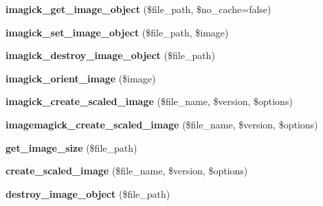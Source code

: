 \begin{DoxyCompactItemize}
\item 
\hypertarget{class_upload_handler_a3798f58b7fc8504ec4f89769b6785a75}{{\bfseries imagick\-\_\-get\-\_\-image\-\_\-object} (\$file\-\_\-path, \$no\-\_\-cache=false)}\label{class_upload_handler_a3798f58b7fc8504ec4f89769b6785a75}

\item 
\hypertarget{class_upload_handler_aa899be32e9c6b6d4b9795a05c08fb37c}{{\bfseries imagick\-\_\-set\-\_\-image\-\_\-object} (\$file\-\_\-path, \$image)}\label{class_upload_handler_aa899be32e9c6b6d4b9795a05c08fb37c}

\item 
\hypertarget{class_upload_handler_a51cc606ddd9e13d4a5bee43ba26902a9}{{\bfseries imagick\-\_\-destroy\-\_\-image\-\_\-object} (\$file\-\_\-path)}\label{class_upload_handler_a51cc606ddd9e13d4a5bee43ba26902a9}

\item 
\hypertarget{class_upload_handler_a4261aff78afb75e49855eaffd9e074f6}{{\bfseries imagick\-\_\-orient\-\_\-image} (\$image)}\label{class_upload_handler_a4261aff78afb75e49855eaffd9e074f6}

\item 
\hypertarget{class_upload_handler_acded50027ac53d16f483f2e5d94f123e}{{\bfseries imagick\-\_\-create\-\_\-scaled\-\_\-image} (\$file\-\_\-name, \$version, \$options)}\label{class_upload_handler_acded50027ac53d16f483f2e5d94f123e}

\item 
\hypertarget{class_upload_handler_a33fe67777b1290c653ca7fb6dbe43fb1}{{\bfseries imagemagick\-\_\-create\-\_\-scaled\-\_\-image} (\$file\-\_\-name, \$version, \$options)}\label{class_upload_handler_a33fe67777b1290c653ca7fb6dbe43fb1}

\item 
\hypertarget{class_upload_handler_aa77d2ad01e1b8a41eaf9a6cc9f4fb891}{{\bfseries get\-\_\-image\-\_\-size} (\$file\-\_\-path)}\label{class_upload_handler_aa77d2ad01e1b8a41eaf9a6cc9f4fb891}

\item 
\hypertarget{class_upload_handler_ae22ed49a6028a0c065752f658941b9ff}{{\bfseries create\-\_\-scaled\-\_\-image} (\$file\-\_\-name, \$version, \$options)}\label{class_upload_handler_ae22ed49a6028a0c065752f658941b9ff}

\item 
\hypertarget{class_upload_handler_ad896bf47df3adc1807ab71c5c41037ea}{{\bfseries destroy\-\_\-image\-\_\-object} (\$file\-\_\-path)}\label{class_upload_handler_ad896bf47df3adc1807ab71c5c41037ea}


\end{DoxyCompactItemize}
